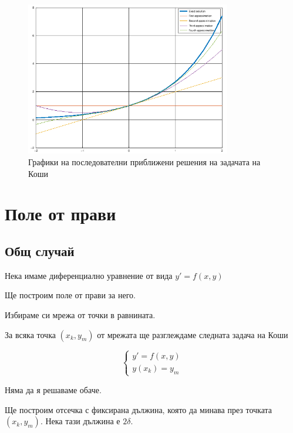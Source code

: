 \documentclass{scrartcl}
\begin{document}


\begin{figure}[H]
    \centering
    \includegraphics[width=0.8\textwidth]{pikar_picture.png}
    \caption{Графики на последователни приближени решения на задачата на Коши}
    \label{fig:pikar_picture}
\end{figure}

\section{Поле от прави}

\subsection{Общ случай}

Нека имаме диференциално уравнение от вида $y' = f(x, y)$

Ще построим поле от прави за него.

Избираме си мрежа от точки в равнината.

За всяка точка $(x_k, y_m)$ от мрежата ще разглеждаме следната задача на Коши

$$
\begin{cases}
y' = f(x, y)\\
y(x_k) = y_m
\end{cases}
$$

Няма да я решаваме обаче.

Ще построим отсечка с фиксирана дължина, която да минава през точката $(x_k, y_m)$. Нека тази дължина е $2\delta$.
\end{document}
